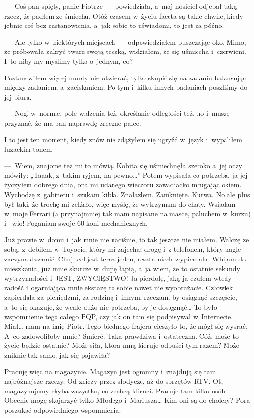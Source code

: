 ---~Coś pan spięty, panie Piotrze ---~powiedziała, a~mój nosiciel odjebał taką rzecz, że padłem ze śmiechu. Otóż 
czasem w~życiu faceta są takie chwile, kiedy jebnie coś bez zastanowienia, a~jak sobie to uświadomi, to jest za późno.

---~Ale tylko w~niektórych miejscach ---~odpowiedziałem puszczając oko. Mimo, że próbowała zakryć twarz swoją teczką, 
widziałem, że się uśmiecha i~czerwieni. I~to niby my myślimy tylko o~jednym, co? 

Postanowiłem więcej mordy nie otwierać, tylko skupić się na zadaniu balansując między zadaniem, a~zaciskaniem. Po tym 
i~kilku innych badaniach poszliśmy do jej biura. 

---~Nogi w~normie, pole widzenia też, określanie odległości też, no i~muszę przyznać, że ma pan naprawdę zręczne palce.

I to jest ten moment, kiedy znów nie zdążyłem się ugryźć w~język i~wypaliłem luzackim tonem 

---~Wiem, znajome też mi to mówią. Kobita się uśmiechnęła szeroko a~jej oczy mówiły: „Taaak, z~takim ryjem, na 
pewno…” Potem wypisała co potrzeba, ja jej życzyłem dobrego dnia, ona mi udanego wieczoru zawadiacko mrugając okiem. 
Wychodzę z~gabinetu i~szukam kibla. Znalazłem. Zamknięte. Kurwa. No ale plus był taki, że trochę mi zelżało, więc 
myślę, że wytrzymam do chaty. Wsiadam w~moje Ferrari (a przynajmniej tak mam napisane na masce, paluchem w~kurzu) i~
wio! Poganiam swoje 60 koni mechanicznych. 

Już prawie w~domu i~jak mnie nie naciśnie, to tak jeszcze nie miałem. Walczę ze sobą, z~debilem w~Toyocie, który mi 
zajechał drogę i~z telefonem, który nagle zaczyna dzwonić. Chuj, cel jest teraz jeden, reszta niech wypierdala. 
Wbijam do mieszkania, już mnie skurcze w~dupę łapią, a~ja wiem, że to ostatnie sekundy wytrzymałości i~JEST, 
ZWYCIĘSTWO! Ja pierdolę, jaką ja czułem wtedy radość i~ogarniająca mnie ekstazę to sobie nawet nie wyobrażacie. 
Człowiek zapierdala za pieniędzmi, za rodziną i~innymi rzeczami by osiągnąć szczęście, a~to się okazuje, że wcale 
dużo nie potrzeba, by je dosięgnąć… To było wspomnienie tego całego BQP, czy jak on tam się podpisywał w~Internecie. 
Miał… mam na imię Piotr. Tego biednego frajera cieszyło to, że mógł się wysrać. A~co zadowoliłoby mnie? Śmierć. Taka 
prawdziwa i~ostateczna. Cóż, może to życie będzie ostatnie? Może siła, która mną kieruje odpuści tym razem? Może 
zniknie tak samo, jak się pojawiła?

Pracuję więc na magazynie. Magazyn jest ogromny i~znajdują się tam najróżniejsze rzeczy. Od zniczy przez słodycze, aż 
do sprzętów RTV. Ot, magazynujemy chyba wszystko, co zechcą klienci. Pracuje tam kilka osób. Obecnie mogę skojarzyć 
tylko Młodego i~Mariusza… Kim oni są do cholery? Pora poszukać odpowiedniego wspomnienia.

